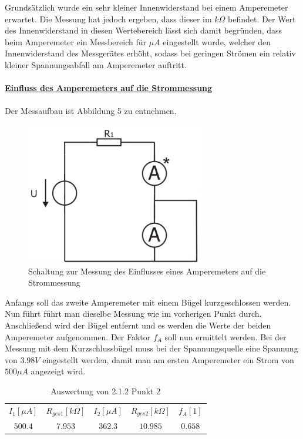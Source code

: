\documentclass[a4paper,12pt]{article}
\begin{document}
	\noindent
	Grundsätzlich wurde ein sehr kleiner Innenwiderstand bei einem Amperemeter erwartet. Die Messung hat jedoch ergeben, dass dieser im $k\Omega$ befindet. Der Wert des Innenwiderstand in diesen Wertebereich lässt sich damit begründen, dass beim Amperemeter ein Messbereich für $\mu A$ eingestellt wurde, welcher den Innenwiderstand des Messgerätes erhöht, sodass bei geringen Strömen ein relativ kleiner Spannungsabfall am Amperemeter auftritt. \\ \\
	\underline{\textbf{Einfluss des Amperemeters auf die Strommessung}} \\ \\
	\noindent
	Der Messaufbau ist Abbildung 5 zu entnehmen.
	\begin{figure}[h]
		\centering
		\includegraphics[width=8cm]{img/Einfluss_Amperemeter}
		\caption{Schaltung zur Messung des Einflusses eines Amperemeters auf die Strommessung}
	\end{figure}
	\newline
	Anfangs soll das zweite Amperemeter mit einem Bügel kurzgeschlossen werden. Nun führt führt man dieselbe Messung wie im vorherigen Punkt durch. Anschließend wird der Bügel entfernt und es werden die Werte der beiden Amperemeter aufgenommen. Der Faktor $f_A$ soll nun ermittelt werden.
	Bei der Messung  mit dem Kurzschlussbügel muss bei der Spannungsquelle eine Spannung von $3.98V$ eingestellt werden, damit man am ersten Amperemeter ein Strom von $500\mu A$ angezeigt wird.
	\newpage
	\begin{table}[h]
		\centering
		\begin{tabular}{|c|c|c|c|c|}
			\hline
			\multirow{2}{*}{$I_1[\mu A]$} & \multirow{2}{*}{$R_{ges1}[k\Omega]$} & \multirow{2}{*}{$I_2[\mu A]$} & \multirow{2}{*}{$R_{ges2}[k\Omega]$} & \multirow{2}{*}{$f_A[1]$} \\
			&  &  &  &  \\ \hline
			\multirow{2}{*}{$500.4$} & \multirow{2}{*}{$7.953$} & \multirow{2}{*}{$362.3$} & \multirow{2}{*}{$10.985$} & \multirow{2}{*}{$0.658$} \\
			&  &  &  &  \\ \hline
		\end{tabular}
		\caption{Auswertung von 2.1.2 Punkt 2}
	\end{table}
\end{document}
